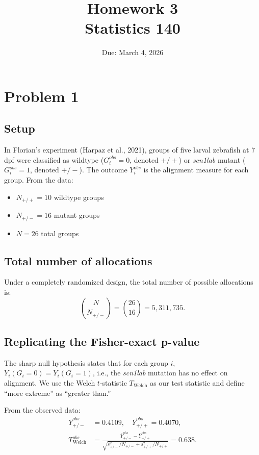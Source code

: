 \documentclass[11pt]{article}
\title{\textbf{Homework 3}\\Statistics 140}
\date{Due: March 4, 2026}
\author{}
\begin{document}
\maketitle

\section*{Problem 1}

\subsection*{Setup}

In Florian's experiment (Harpaz et al., 2021), groups of five larval zebrafish at 7 dpf were classified as wildtype ($G_i^{obs}=0$, denoted $+/+$) or \textit{scn1lab} mutant ($G_i^{obs}=1$, denoted $+/-$). The outcome $Y_i^{obs}$ is the alignment measure for each group. From the data:
\begin{itemize}
  \item $N_{+/+} = 10$ wildtype groups
  \item $N_{+/-} = 16$ mutant groups
  \item $N = 26$ total groups
\end{itemize}

\subsection*{Total number of allocations}

Under a completely randomized design, the total number of possible allocations is:
\[
  \binom{N}{N_{+/-}} = \binom{26}{16} = 5{,}311{,}735.
\]

\subsection*{Replicating the Fisher-exact p-value}

The sharp null hypothesis states that for each group $i$, $Y_i(G_i=0) = Y_i(G_i=1)$, i.e., the \textit{scn1lab} mutation has no effect on alignment. We use the Welch $t$-statistic $T_{\text{Welch}}$ as our test statistic and define ``more extreme'' as ``greater than.''

From the observed data:
\begin{align*}
  \bar{Y}_{+/-}^{obs} &= 0.4109, \quad \bar{Y}_{+/+}^{obs} = 0.4070, \\
  T_{\text{Welch}}^{obs} &= \frac{\bar{Y}_{+/-}^{obs} - \bar{Y}_{+/+}^{obs}}{\sqrt{s_{+/-}^2/N_{+/-} + s_{+/+}^2/N_{+/+}}} = 0.638.
\end{align*}
\end{document}
